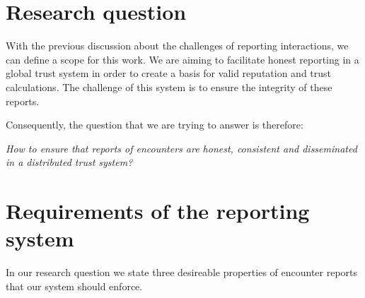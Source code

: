 
\section{Research question}
With the previous discussion about the challenges of reporting interactions, we can define a scope
for this work. We are aiming to facilitate honest reporting in a global trust system in order to 
create a basis for valid reputation and trust calculations. The challenge of this system is to 
ensure the integrity of these reports. 

Consequently, the question that we are trying to answer is therefore:
\begin{center}
    \textit{How to ensure that reports of encounters are honest, consistent and disseminated in a distributed trust system?}
\end{center}



\section{Requirements of the reporting system}
In our research question we state three desireable properties of encounter reports that our system 
should enforce.

